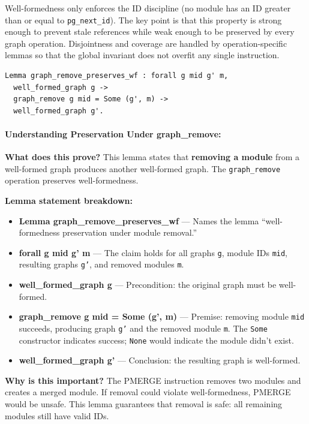 Well-formedness only enforces the ID discipline (no module has an ID greater than or equal to \texttt{pg\_next\_id}). The key point is that this property is strong enough to prevent stale references while weak enough to be preserved by every graph operation. Disjointness and coverage are handled by operation-specific lemmas so that the global invariant does not overfit any single instruction.

\begin{theorem}
\begin{lstlisting}
Lemma graph_remove_preserves_wf : forall g mid g' m,
  well_formed_graph g ->
  graph_remove g mid = Some (g', m) ->
  well_formed_graph g'.
\end{lstlisting}
\end{theorem}

\paragraph{Understanding Preservation Under graph\_remove:}

\textbf{What does this prove?} This lemma states that \textbf{removing a module} from a well-formed graph produces another well-formed graph. The \texttt{graph\_remove} operation preserves well-formedness.

\textbf{Lemma statement breakdown:}
\begin{itemize}
    \item \textbf{Lemma graph\_remove\_preserves\_wf} — Names the lemma ``well-formedness preservation under module removal.''
    \item \textbf{forall g mid g' m} — The claim holds for all graphs \texttt{g}, module IDs \texttt{mid}, resulting graphs \texttt{g'}, and removed modules \texttt{m}.
    \item \textbf{well\_formed\_graph g} — Precondition: the original graph must be well-formed.
    \item \textbf{graph\_remove g mid = Some (g', m)} — Premise: removing module \texttt{mid} succeeds, producing graph \texttt{g'} and the removed module \texttt{m}. The \texttt{Some} constructor indicates success; \texttt{None} would indicate the module didn't exist.
    \item \textbf{well\_formed\_graph g'} — Conclusion: the resulting graph is well-formed.
\end{itemize}

\textbf{Why is this important?} The PMERGE instruction removes two modules and creates a merged module. If removal could violate well-formedness, PMERGE would be unsafe. This lemma guarantees that removal is safe: all remaining modules still have valid IDs.

